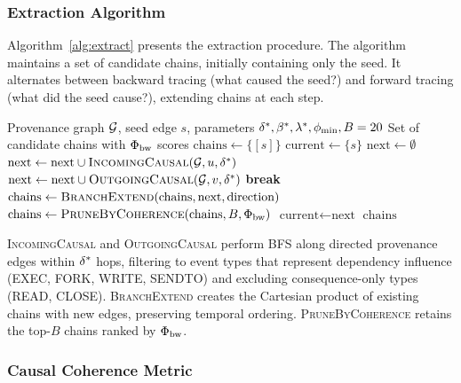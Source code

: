 \subsubsection{Extraction Algorithm}

Algorithm~\ref{alg:extract} presents the extraction procedure. The algorithm maintains a set of candidate chains, initially containing only the seed. It alternates between backward tracing (what caused the seed?) and forward tracing (what did the seed cause?), extending chains at each step.

\begin{algorithm}[t]
\caption{Causal Chain Extraction}
\label{alg:extract}
\begin{algorithmic}[1]
\Require Provenance graph $\mathcal{G}$, seed edge $s$, parameters $\delta^*, \beta^*, \lambda^*, \phi_{\min}, B=20$
\Ensure Set of candidate chains with $\Phi_{\text{bw}}$ scores
\State $\text{chains} \gets \{ [s] \}$
\State $\text{current} \gets \{ s \}$
    \State $\text{next} \gets \emptyset$
        \State $\text{next} \gets \text{next} \cup \textsc{IncomingCausal}(\mathcal{G}, u, \delta^*)$
      \Else
        \State $\text{next} \gets \text{next} \cup \textsc{OutgoingCausal}(\mathcal{G}, v, \delta^*)$
      \EndIf
    \EndFor
     \State \textbf{break} 
    \EndIf
    \State $\text{chains} \gets \textsc{BranchExtend}(\text{chains}, \text{next}, \text{direction})$
      \State $\text{chains} \gets \textsc{PruneByCoherence}(\text{chains}, B, \Phi_{\text{bw}})$
    \EndIf
    \State $\text{current} \gets \text{next}$
  \EndFor
\EndFor
\State \Return $\text{chains}$
\end{algorithmic}
\end{algorithm}

\textsc{IncomingCausal} and \textsc{OutgoingCausal} perform BFS along directed provenance edges within $\delta^*$ hops, filtering to event types that represent dependency influence (EXEC, FORK, WRITE, SENDTO) and excluding consequence-only types (READ, CLOSE). \textsc{BranchExtend} creates the Cartesian product of existing chains with new edges, preserving temporal ordering. \textsc{PruneByCoherence} retains the top-$B$ chains ranked by $\Phi_{\text{bw}}$.

\subsubsection{Causal Coherence Metric}
\label{sec:metric_def}

